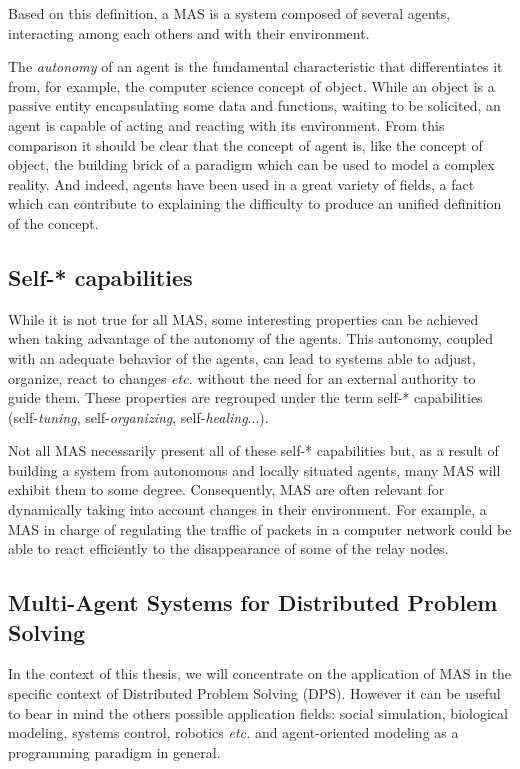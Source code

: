 Based on this definition, a MAS is a system composed of several agents, interacting among each others and with their environment.

The \emph{autonomy} of an agent is the fundamental characteristic that differentiates it from, for example, the computer science concept of object. While an object is a passive entity encapsulating some data and functions, waiting to be solicited, an agent is capable of acting and reacting with its environment. From this comparison it should be clear that the concept of agent is, like the concept of object, the building brick of a paradigm which can be used to model a complex reality. And indeed, agents have been used in a great variety of fields, a fact which can contribute to explaining the difficulty to produce an unified definition of the concept.

\subsection{Self-* capabilities}

While it is not true for all MAS, some interesting properties can be achieved when taking advantage of the autonomy of the agents. This autonomy, coupled with an adequate behavior of the agents, can lead to systems able to adjust, organize, react to changes \emph{etc.} without the need for an external authority to guide them. These properties are regrouped under the term self-* capabilities (self-\emph{tuning}, self-\emph{organizing}, self-\emph{healing}...).

Not all MAS necessarily present all of these self-* capabilities but, as a result of building a system from autonomous and locally situated agents, many MAS will exhibit them to some degree. Consequently, MAS are often relevant for dynamically taking into account changes in their environment. For example, a MAS in charge of regulating the traffic of packets in a computer network could be able to react efficiently to the disappearance of some of the relay nodes.

\subsection{Multi-Agent Systems for Distributed Problem Solving}

In the context of this thesis, we will concentrate on the application of MAS in the specific context of Distributed Problem Solving (DPS). However it can be useful to bear in mind the others possible application fields: social simulation, biological modeling, systems control, robotics \emph{etc.} and agent-oriented modeling as a programming paradigm in general.

